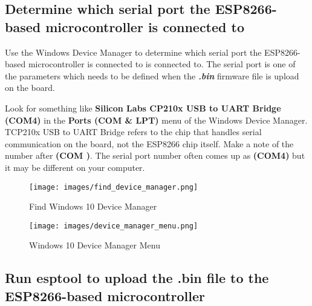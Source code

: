 \documentclass{book}
\makeatletter
\def\maxwidth{\ifdim\Gin@nat@width>\linewidth\linewidth
\else\Gin@nat@width\fi}
\let\Oldincludegraphics\includegraphics
\renewcommand{\includegraphics}[1]{\Oldincludegraphics[width=.8\maxwidth]{#1}}
\makeatother
\begin{document}
    
        \hypertarget{determine-which-serial-port-the-esp8266-based-microcontroller-is-connected-to}{%
\subsection{Determine which serial port the ESP8266-based
microcontroller is connected
to}\label{determine-which-serial-port-the-esp8266-based-microcontroller-is-connected-to}}
    




    
        Use the Windows Device Manager to determine which serial port the
ESP8266-based microcontroller is connected to is connected to. The
serial port is one of the parameters which needs to be defined when the
\textbf{\emph{.bin}} firmware file is upload on the board.

Look for something like \textbf{Silicon Labs CP210x USB to UART Bridge
(COM4)} in the \textbf{Ports (COM \& LPT)} menu of the Windows Device
Manager. TCP210x USB to UART Bridge refers to the chip that handles
serial communication on the board, not the ESP8266 chip itself. Make a
note of the number after \textbf{(COM )}. The serial port number often
comes up as \textbf{(COM4)} but it may be different on your computer.

\begin{figure}
\centering
\texttt{[image: images/find\_device\_manager.png]}
\caption{Find Windows 10 Device Manager}
\end{figure}

\begin{figure}
\centering
\texttt{[image: images/device\_manager\_menu.png]}
\caption{Windows 10 Device Manager Menu}
\end{figure}
    




    
        \hypertarget{run-esptool-to-upload-the-.bin-file-to-the-esp8266-based-microcontroller}{%
\subsection{Run esptool to upload the .bin file to the ESP8266-based
microcontroller}\label{run-esptool-to-upload-the-.bin-file-to-the-esp8266-based-microcontroller}}
    
\end{document}

